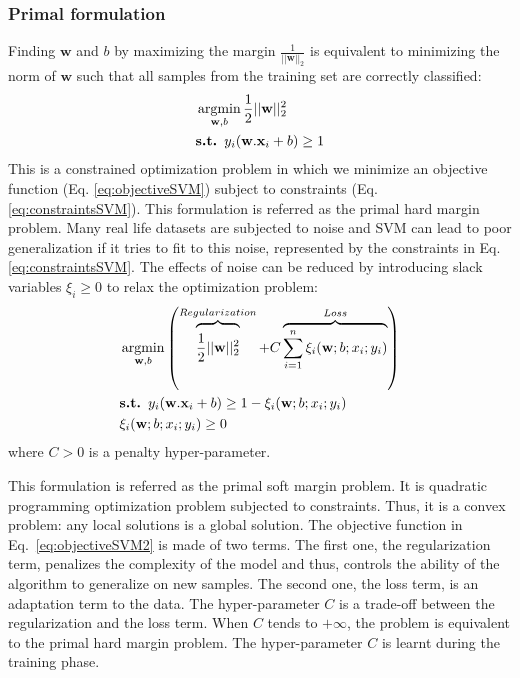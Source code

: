 \subsubsection{Primal formulation}
Finding $\textbf{w}$ and $b$ by maximizing the margin $\frac{1}{||\textbf{w}||_2}$ is equivalent to minimizing the norm of $\textbf{w}$ such that all samples from the training set are correctly classified:
	\begin{align}
		& \argmin_{\textbf{w},b} \frac{1}{2} ||\textbf{w}||_2^2 \label{eq:objectiveSVM}\\
		& \textbf{s.t. } y_i(\textbf{w}.\textbf{x}_i+b) \geq 1 \label{eq:constraintsSVM}
	\end{align}
This is a constrained optimization problem in which we minimize an objective function (Eq. \ref{eq:objectiveSVM}) subject to constraints (Eq. \ref{eq:constraintsSVM}). This formulation is referred as the primal hard margin problem. Many real life datasets are subjected to noise and SVM can lead to poor generalization if it tries to fit to this noise, represented by the constraints in Eq. \ref{eq:constraintsSVM}. The effects of noise can be reduced by introducing slack variables $\xi_i \geq 0$ to relax the optimization problem:
	\begin{align}
	& \argmin_{\textbf{w},b}  
	\left( 
	\overbrace{\vphantom{\sum_{i=1}^n \xi_i}
		\frac{1}{2}||\textbf{w}||^2_2}^{Regularization}
	+ C \overbrace{\sum\limits_{i=1}^{n}\xi_i(\textbf{w}; b; x_i; y_i)}^{Loss} \right) 
	\label{eq:objectiveSVM2}\\
	& \textbf{s.t. } y_i(\textbf{w}.\textbf{x}_i+b) \geq 1 -\xi_i(\textbf{w}; b; x_i; y_i) \label{eq:constraintsSVM2} \\
	&  \xi_i(\textbf{w}; b; x_i; y_i) \geq 0 \label{eq:constraintsSVM20}
	\end{align}
\noindent where $C > 0$ is a penalty hyper-parameter. 
	
This formulation is referred as the primal soft margin problem. It is quadratic programming optimization problem subjected to constraints. Thus, it is a convex problem: any local solutions is a global solution. The objective function in Eq.~\ref{eq:objectiveSVM2} is made of two terms. The first one, the regularization term, penalizes the complexity of the model and thus, controls the ability of the algorithm to generalize on new samples. The second one, the loss term, is an adaptation term to the data. The hyper-parameter $C$ is a trade-off between the regularization and the loss term. When $C$ tends to $+\infty$, the problem is equivalent to the primal hard margin problem. The hyper-parameter $C$ is learnt during the training phase. 


